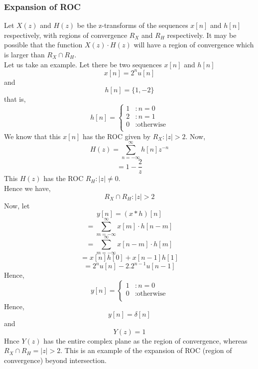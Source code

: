 {\subsubsection{Expansion of ROC}
Let $X(z)$ and $H(z)$ be the z-transforms of the sequences $x[n]$ and $h[n]$ respectively, with regions of convergence $R_X$ and $R_H$ respectively. It may be possible that the function $X(z)\cdot H(z)$ will have a region of convergence which is larger than $R_X \cap R_H$. \\
Let us take an example.
Let there be two sequences $x[n]$ and $h[n]$
\[ 
x[n]=   2^n u[n] 
\]
and
\[
h[n]= \{ 1,-2 \}
\]
that is,
\begin{displaymath}
   h[n] = \left\{
     \begin{array}{lr}
       1 & :  n =0\\
       2 & : n = 1\\
       0 & :\text{otherwise}\\
     \end{array}
   \right.
\end{displaymath}
We know that this $x[n]$ has the ROC given by $R_X: |z|>2$. Now,
\[
H(z)= \sum\limits_{n=-\infty}^{\infty} h[n]z^{-n}
\]
\[
= 1 - \frac{2}{z}
\]
This $H(z)$ has the ROC $R_H: |z|\neq 0$.\\ Hence we have,
\[
R_X \cap R_H : |z|>2
\]
Now, let
\[
y[n]=   (x*h)[n]
\]
\[
= \sum\limits_{m=-\infty}^{\infty}x[m]\cdot h[n-m]
\]
\[
= \sum\limits_{m=-\infty}^{\infty}x[n-m]\cdot h[m]
\]
\[
= x[n]h[0]+x[n-1]h[1]  
\]
\[
= 2^n u[n] - 2.2^{n-1} u[n-1]
\]
Hence,
\begin{displaymath}
   y[n] = \left\{
     \begin{array}{lr}
       1 & :  n =0\\
       0 & :  \text{otherwise} \\
     \end{array}
   \right.
\end{displaymath} 
Hence,
\[
y[n]= \delta [n]
\]
and
\[
Y(z) = 1
\]
Hnce $Y(z)$ has the entire complex plane as the region of convergence, whereas $ R_X \cap R_H = |z|>2$. This is an example of the expansion of ROC (region of convergence) beyond intersection.
}

